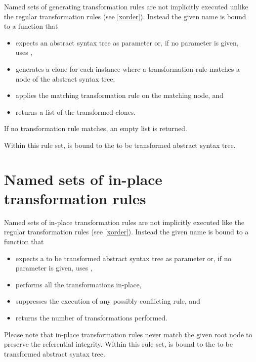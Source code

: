 Named sets of generating transformation rules are not implicitly
executed unlike the regular transformation rules (see \ref{xorder}).
Instead the given name is bound to a function that

\begin{itemize}
   \item expects an abstract syntax tree
      as parameter or, if no parameter is given, uses ,
   \item generates a clone for each instance where a
      transformation rule matches a node of the abstract syntax tree,
   \item applies the matching transformation rule on the matching node, and
   \item returns a list of the transformed clones.
\end{itemize}

\noindent
If no transformation rule matches, an empty list is returned.

Within this rule set,  is bound to the
to be transformed abstract syntax tree.

\begin{grammar}
      \produces {} 
	 \lextoken{\{} 
	 \lextoken{\}}
\end{grammar}

\section{Named sets of in-place transformation rules}
\label{named-inplace-trrules}

Named sets of in-place transformation rules are not implicitly executed
like the regular transformation rules (see \ref{xorder}). Instead the
given name is bound to a function that

\begin{itemize}
   \item expects a to be transformed abstract syntax tree
      as parameter or, if no parameter is given, uses ,
   \item performs all the transformations in-place,
   \item suppresses the execution of any possibly conflicting rule, and
   \item returns the number of transformations performed.
\end{itemize}

Please note that in-place transformation rules never match the
given root node to preserve the referential integrity.
Within this rule set,  is bound to the
to be transformed abstract syntax tree.

\begin{grammar}
      \produces {}
	  
	  \nextline
	 \lextoken{\{} 
	 \lextoken{\}}
\end{grammar}

\endinput
